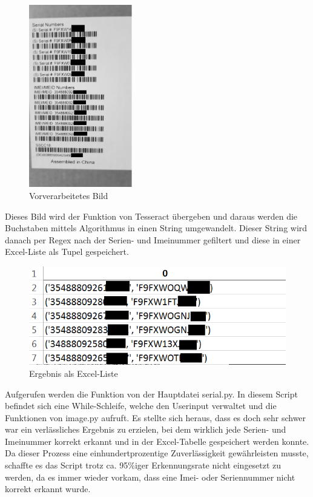\begin{figure}[H] 
  \centering
     \includegraphics[width=0.4\textwidth]{serial.png}
  \caption{Vorverarbeitetes Bild}
  \label{fig:Bild1}
\end{figure}
\noindent
Dieses Bild wird der Funktion von Tesseract übergeben und daraus werden die Buchstaben mittels Algorithmus in einen String umgewandelt. Dieser String wird danach per Regex nach der Serien- und Imeinummer gefiltert und diese in einer Excel-Liste als Tupel gespeichert.
\begin{figure}[H] 
  \centering
     \includegraphics[width=1\textwidth]{tupel.png}
  \caption{Ergebnis als Excel-Liste}
  \label{fig:Bild1}
\end{figure}
\noindent
Aufgerufen werden die Funktion von der Hauptdatei serial.py. In diesem Script befindet sich eine While-Schleife, welche den Userinput verwaltet und die Funktionen von image.py aufruft. 
Es stellte sich heraus, dass es doch sehr schwer war ein verlässliches Ergebnis zu erzielen, bei dem wirklich jede Serien- und Imeinummer korrekt erkannt und in der Excel-Tabelle gespeichert werden konnte. Da dieser Prozess eine einhundertprozentige Zuverlässigkeit gewährleisten musste, schaffte es das Script trotz ca. 95\%iger Erkennungsrate nicht eingesetzt zu werden, da es immer wieder vorkam, dass eine Imei- oder Seriennummer nicht korrekt erkannt wurde. 
\\

